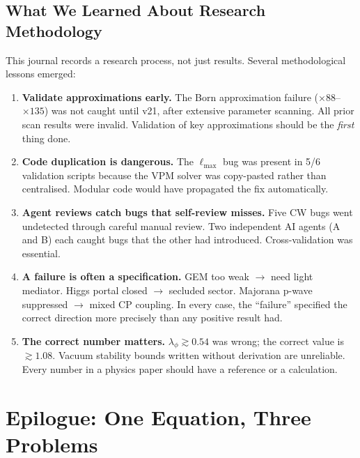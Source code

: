 \documentclass[12pt, a4paper]{article}
\begin{document}
\subsection{What We Learned About Research Methodology}

This journal records a research process, not just results. Several methodological lessons emerged:

\begin{enumerate}

\item \textbf{Validate approximations early.} The Born approximation failure ($\times 88$--$\times 135$) was not caught until v21, after extensive parameter scanning. All prior scan results were invalid. Validation of key approximations should be the \emph{first} thing done.

\item \textbf{Code duplication is dangerous.} The $\ell_\text{max}$ bug was present in 5/6 validation scripts because the VPM solver was copy-pasted rather than centralised. Modular code would have propagated the fix automatically.

\item \textbf{Agent reviews catch bugs that self-review misses.} Five CW bugs went undetected through careful manual review. Two independent AI agents (A and B) each caught bugs that the other had introduced. Cross-validation was essential.

\item \textbf{A failure is often a specification.} GEM too weak $\to$ need light mediator. Higgs portal closed $\to$ secluded sector. Majorana p-wave suppressed $\to$ mixed CP coupling. In every case, the ``failure'' specified the correct direction more precisely than any positive result had.

\item \textbf{The correct number matters.} $\lambda_\phi \gtrsim 0.54$ was wrong; the correct value is $\gtrsim 1.08$. Vacuum stability bounds written without derivation are unreliable. Every number in a physics paper should have a reference or a calculation.

\end{enumerate}

\newpage

\section*{Epilogue: One Equation, Three Problems}
\end{document}
